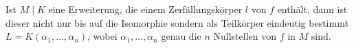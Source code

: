 \begin{remark}
	Ist $M\mid K$ eine Erweiterung, die einem Zerfällungskörper $l$ von $f$ enthält, dann ist dieser nicht nur bis auf die Isomorphie sondern als Teilkörper eindeutig bestimmt $L = K(\alpha_1, \dots, \alpha_n)$, wobei $\alpha_1, \dots, \alpha_n$ genau die $n$ Nullstellen von $f$ in $M$ sind.
\end{remark}